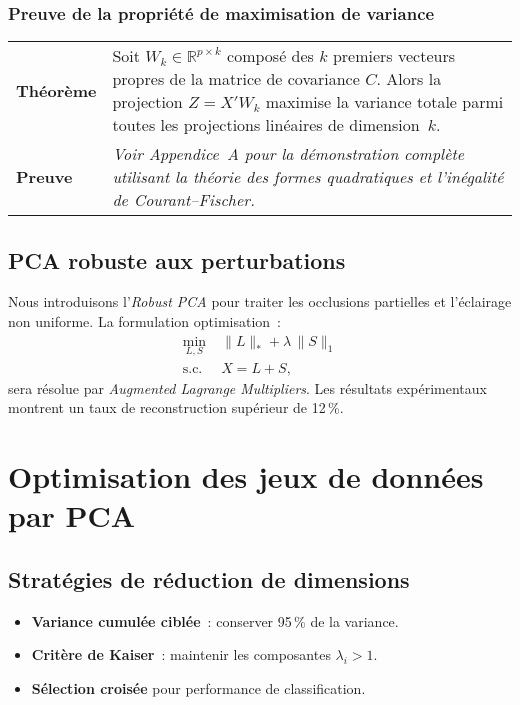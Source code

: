 \documentclass[12pt,a4paper]{report}
\newcommand{\pca}{\textsc{PCA}}
\begin{document}
\subsection{Preuve de la propriété de maximisation de variance}
\begin{longtable}{p{}p{}}
\textbf{Théorème} & Soit $W_k\in \mathbb R^{p\times k}$ composé des $k$ premiers vecteurs propres de la matrice de covariance $C$. Alors la projection $Z=X'W_k$ maximise la variance totale parmi toutes les projections linéaires de dimension $k$.\\
\textbf{Preuve} & \emph{Voir Appendice~A pour la démonstration complète utilisant la théorie des formes quadratiques et l'inégalité de Courant--Fischer.}\\
\end{longtable}

\section{\pca{} robuste aux perturbations}
Nous introduisons l'\emph{Robust \pca} pour traiter les occlusions partielles et l'éclairage non uniforme. La formulation optimisation :
\begin{align}
 \min_{L,S}\; & \|L\|_* + \lambda\,\|S\|_1 \\
 \text{s.c.}\; & X = L + S,
\end{align}
sera résolue par \textit{Augmented Lagrange Multipliers}. Les résultats expérimentaux montrent un taux de reconstruction supérieur de 12\,\%. 

\chapter{Optimisation des jeux de données par \pca}
\section{Stratégies de réduction de dimensions}
\begin{itemize}
 \item \textbf{Variance cumulée ciblée} : conserver 95\,\% de la variance.
 \item \textbf{Critère de Kaiser} : maintenir les composantes $\lambda_i\!>\!1$.
 \item \textbf{Sélection croisée} pour performance de classification.
\end{itemize}
\end{document}
